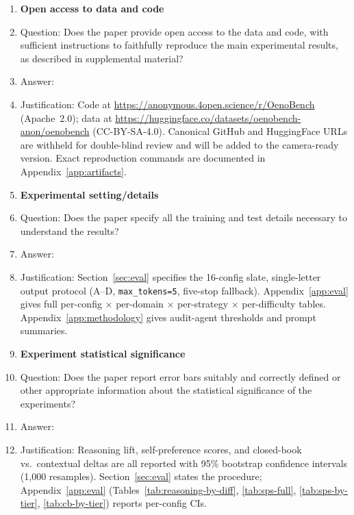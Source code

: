 \begin{enumerate}
\item {\bf Open access to data and code}
    \item[] Question: Does the paper provide open access to the data and code, with sufficient instructions to faithfully reproduce the main experimental results, as described in supplemental material?
    \item[] Answer: \answerYes{}
    \item[] Justification: Code at \url{https://anonymous.4open.science/r/OenoBench} (Apache~2.0); data at \url{https://huggingface.co/datasets/oenobench-anon/oenobench} (CC-BY-SA-4.0). Canonical GitHub and HuggingFace URLs are withheld for double-blind review and will be added to the camera-ready version. Exact reproduction commands are documented in Appendix~\ref{app:artifacts}.

\item {\bf Experimental setting/details}
    \item[] Question: Does the paper specify all the training and test details necessary to understand the results?
    \item[] Answer: \answerYes{}
    \item[] Justification: Section~\ref{sec:eval} specifies the 16-config slate, single-letter output protocol (A--D, \texttt{max\_tokens=5}, five-stop fallback). Appendix~\ref{app:eval} gives full per-config × per-domain × per-strategy × per-difficulty tables. Appendix~\ref{app:methodology} gives audit-agent thresholds and prompt summaries.

\item {\bf Experiment statistical significance}
    \item[] Question: Does the paper report error bars suitably and correctly defined or other appropriate information about the statistical significance of the experiments?
    \item[] Answer: \answerYes{}
    \item[] Justification: Reasoning lift, self-preference scores, and closed-book vs.\ contextual deltas are all reported with 95\% bootstrap confidence intervals (1{,}000 resamples). Section~\ref{sec:eval} states the procedure; Appendix~\ref{app:eval} (Tables~\ref{tab:reasoning-by-diff}, \ref{tab:sps-full}, \ref{tab:sps-by-tier}, \ref{tab:cb-by-tier}) reports per-config CIs.


\end{enumerate}
